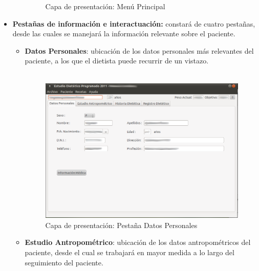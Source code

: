 \begin{itemize}
\begin{itemize}
\begin{figure}[H]
\begin{center}
  \end{center}
  \caption{Capa de presentación: Menú Principal}
\end{figure}
\end{itemize}

\newpage
\item \textbf{Pestañas de información e interactuación:} constará de cuatro pestañas, desde las cuales se manejará la información relevante sobre el paciente.
\begin{itemize}
\item \textbf{Datos Personales}: ubicación de los datos personales más relevantes del paciente, a los que el dietista puede recurrir de un vistazo.\\\\
\begin{figure}[H]
  \label{datos}
  \begin{center}
    \includegraphics[scale=0.5]{../../Image/paciente-datos.png}
  \end{center}
  \caption{Capa de presentación: Pestaña Datos Personales}
\end{figure}
\newpage
\item \textbf{Estudio Antropométrico}: ubicación de los datos antropométricos del paciente, desde el cual se trabajará en mayor medida a lo largo del seguimiento del paciente.\\\\
\begin{figure}[H]
  \label{antrop}
  \begin{center}

\end{center}
\end{figure}
\end{itemize}
\end{itemize}
